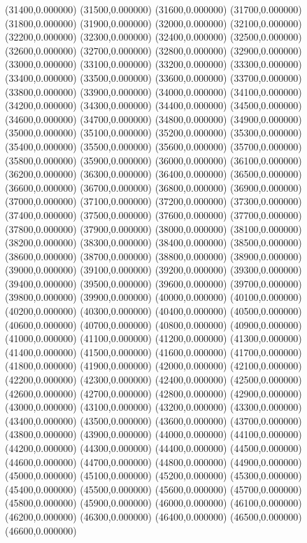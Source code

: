 (31400,0.000000)
(31500,0.000000)
(31600,0.000000)
(31700,0.000000)
(31800,0.000000)
(31900,0.000000)
(32000,0.000000)
(32100,0.000000)
(32200,0.000000)
(32300,0.000000)
(32400,0.000000)
(32500,0.000000)
(32600,0.000000)
(32700,0.000000)
(32800,0.000000)
(32900,0.000000)
(33000,0.000000)
(33100,0.000000)
(33200,0.000000)
(33300,0.000000)
(33400,0.000000)
(33500,0.000000)
(33600,0.000000)
(33700,0.000000)
(33800,0.000000)
(33900,0.000000)
(34000,0.000000)
(34100,0.000000)
(34200,0.000000)
(34300,0.000000)
(34400,0.000000)
(34500,0.000000)
(34600,0.000000)
(34700,0.000000)
(34800,0.000000)
(34900,0.000000)
(35000,0.000000)
(35100,0.000000)
(35200,0.000000)
(35300,0.000000)
(35400,0.000000)
(35500,0.000000)
(35600,0.000000)
(35700,0.000000)
(35800,0.000000)
(35900,0.000000)
(36000,0.000000)
(36100,0.000000)
(36200,0.000000)
(36300,0.000000)
(36400,0.000000)
(36500,0.000000)
(36600,0.000000)
(36700,0.000000)
(36800,0.000000)
(36900,0.000000)
(37000,0.000000)
(37100,0.000000)
(37200,0.000000)
(37300,0.000000)
(37400,0.000000)
(37500,0.000000)
(37600,0.000000)
(37700,0.000000)
(37800,0.000000)
(37900,0.000000)
(38000,0.000000)
(38100,0.000000)
(38200,0.000000)
(38300,0.000000)
(38400,0.000000)
(38500,0.000000)
(38600,0.000000)
(38700,0.000000)
(38800,0.000000)
(38900,0.000000)
(39000,0.000000)
(39100,0.000000)
(39200,0.000000)
(39300,0.000000)
(39400,0.000000)
(39500,0.000000)
(39600,0.000000)
(39700,0.000000)
(39800,0.000000)
(39900,0.000000)
(40000,0.000000)
(40100,0.000000)
(40200,0.000000)
(40300,0.000000)
(40400,0.000000)
(40500,0.000000)
(40600,0.000000)
(40700,0.000000)
(40800,0.000000)
(40900,0.000000)
(41000,0.000000)
(41100,0.000000)
(41200,0.000000)
(41300,0.000000)
(41400,0.000000)
(41500,0.000000)
(41600,0.000000)
(41700,0.000000)
(41800,0.000000)
(41900,0.000000)
(42000,0.000000)
(42100,0.000000)
(42200,0.000000)
(42300,0.000000)
(42400,0.000000)
(42500,0.000000)
(42600,0.000000)
(42700,0.000000)
(42800,0.000000)
(42900,0.000000)
(43000,0.000000)
(43100,0.000000)
(43200,0.000000)
(43300,0.000000)
(43400,0.000000)
(43500,0.000000)
(43600,0.000000)
(43700,0.000000)
(43800,0.000000)
(43900,0.000000)
(44000,0.000000)
(44100,0.000000)
(44200,0.000000)
(44300,0.000000)
(44400,0.000000)
(44500,0.000000)
(44600,0.000000)
(44700,0.000000)
(44800,0.000000)
(44900,0.000000)
(45000,0.000000)
(45100,0.000000)
(45200,0.000000)
(45300,0.000000)
(45400,0.000000)
(45500,0.000000)
(45600,0.000000)
(45700,0.000000)
(45800,0.000000)
(45900,0.000000)
(46000,0.000000)
(46100,0.000000)
(46200,0.000000)
(46300,0.000000)
(46400,0.000000)
(46500,0.000000)
(46600,0.000000)
